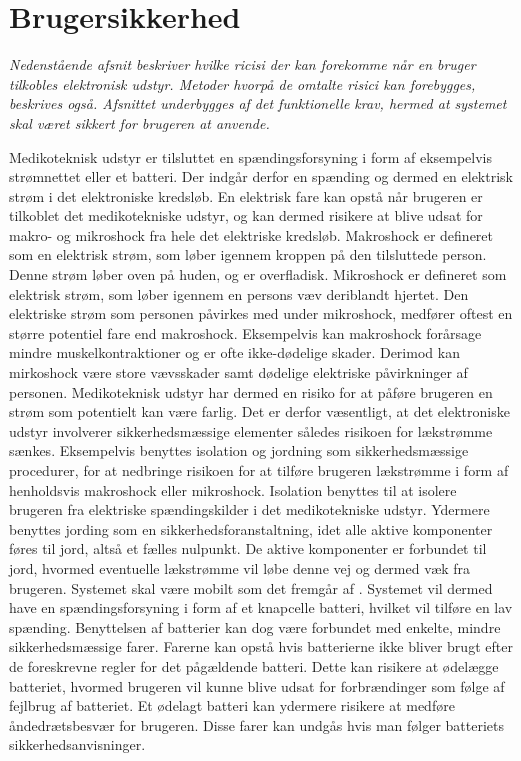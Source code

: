 \section{Brugersikkerhed}
\textit{Nedenstående afsnit beskriver hvilke ricisi der kan forekomme når en bruger tilkobles elektronisk udstyr. Metoder hvorpå de omtalte risici kan forebygges, beskrives også. Afsnittet underbygges af det funktionelle krav, hermed at systemet skal været sikkert for brugeren at anvende.}

Medikoteknisk udstyr er tilsluttet en spændingsforsyning i form af eksempelvis strømnettet eller et batteri. Der indgår derfor en spænding og dermed en elektrisk strøm i det elektroniske kredsløb. En elektrisk fare kan opstå når brugeren er tilkoblet det medikotekniske udstyr, og kan dermed risikere at blive udsat for makro- og mikroshock fra hele det elektriske kredsløb. Makroshock er defineret som en elektrisk strøm, som løber igennem kroppen på den tilsluttede person. Denne strøm løber oven på huden, og er overfladisk. Mikroshock er defineret som elektrisk strøm, som løber igennem en persons væv deriblandt hjertet. Den elektriske strøm som personen påvirkes med under mikroshock, medfører oftest en større potentiel fare end makroshock. Eksempelvis kan makroshock forårsage mindre muskelkontraktioner og er ofte ikke-dødelige skader. Derimod kan mirkoshock være store vævsskader samt dødelige elektriske påvirkninger af personen. \citep{Webster2011} \newline
Medikoteknisk udstyr har dermed en risiko for at påføre brugeren en strøm som potentielt kan være farlig. Det er derfor væsentligt, at det elektroniske udstyr involverer sikkerhedsmæssige elementer således risikoen for lækstrømme sænkes. Eksempelvis benyttes isolation og jordning som sikkerhedsmæssige procedurer, for at nedbringe risikoen for at tilføre brugeren lækstrømme i form af henholdsvis makroshock eller mikroshock. Isolation benyttes til at isolere brugeren fra elektriske spændingskilder i det medikotekniske udstyr. Ydermere benyttes jording som en sikkerhedsforanstaltning, idet alle aktive komponenter føres til jord, altså et fælles nulpunkt. De aktive komponenter er forbundet til jord, hvormed eventuelle lækstrømme vil løbe denne vej og dermed væk fra brugeren. \citep{Webster2011} \newline 
Systemet skal være mobilt som det fremgår af . Systemet vil dermed have en spændingsforsyning i form af et knapcelle batteri, hvilket vil tilføre en lav spænding. Benyttelsen af batterier kan dog være forbundet med enkelte, mindre sikkerhedsmæssige farer. Farerne kan opstå hvis batterierne ikke bliver brugt efter de foreskrevne regler for det pågældende batteri. Dette kan risikere at ødelægge batteriet, hvormed brugeren vil kunne blive udsat for forbrændinger som følge af fejlbrug af batteriet. Et ødelagt batteri kan ydermere risikere at medføre åndedrætsbesvær for brugeren. Disse farer kan undgås hvis man følger batteriets sikkerhedsanvisninger. \citep{NREL2011}


